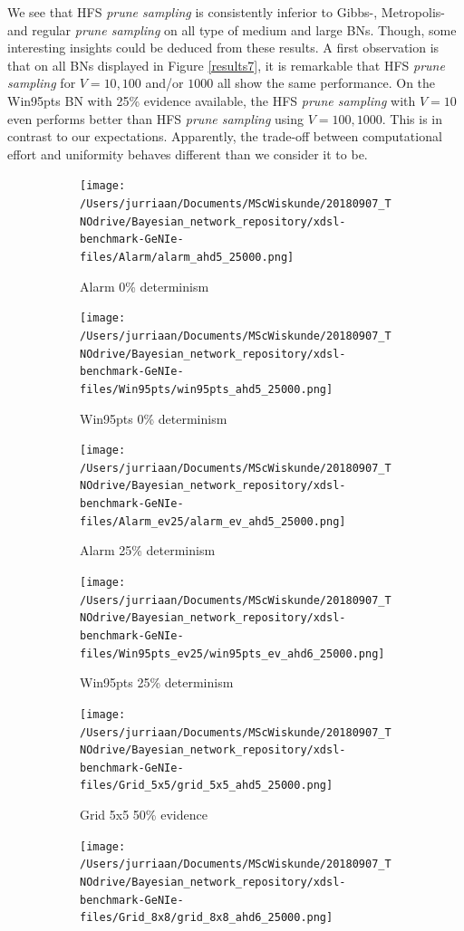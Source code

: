 \documentclass[a4paper, twoside, 11pt]{report}
\theoremstyle{plain}
\theoremstyle{definition}
\theoremstyle{remark}
\newcommand{\ps}{\textit{prune sampling }}
\begin{document}
We see that HFS \ps is consistently inferior to Gibbs-, Metropolis- and regular \ps on all type of medium and large BNs. Though, some interesting insights could be deduced from these results. A first observation is that on all BNs displayed in Figure \ref{results7}, it is remarkable that HFS \ps for $V = 10, 100$ and/or $1000$ all show the same performance. On the Win95pts BN with 25\% evidence available, the HFS \ps with $V = 10$ even performs better than HFS \ps using $V = 100, 1000$. This is in contrast to our expectations. Apparently, the trade-off between computational effort and uniformity behaves different than we consider it to be.
\begin{figure}[h!]
\centering
\begin{subfigure}{.5\linewidth}
\texttt{[image: /Users/jurriaan/Documents/MScWiskunde/20180907\_TNOdrive/Bayesian\_network\_repository/xdsl-benchmark-GeNIe-files/Alarm/alarm\_ahd5\_25000.png]}
\caption{Alarm 0\% determinism}%
\label{alarm_ev}%
\end{subfigure}\hfill%
\begin{subfigure}{.5\linewidth}
\texttt{[image: /Users/jurriaan/Documents/MScWiskunde/20180907\_TNOdrive/Bayesian\_network\_repository/xdsl-benchmark-GeNIe-files/Win95pts/win95pts\_ahd5\_25000.png]}
\caption{Win95pts 0\% determinism}%
\label{win95pts_ev}%
\end{subfigure}
\begin{subfigure}{.5\linewidth}
\texttt{[image: /Users/jurriaan/Documents/MScWiskunde/20180907\_TNOdrive/Bayesian\_network\_repository/xdsl-benchmark-GeNIe-files/Alarm\_ev25/alarm\_ev\_ahd5\_25000.png]}
\caption{Alarm 25\% determinism}%
\label{grid_3x3}%
\end{subfigure}\hfill%
\begin{subfigure}{.5\linewidth}
\texttt{[image: /Users/jurriaan/Documents/MScWiskunde/20180907\_TNOdrive/Bayesian\_network\_repository/xdsl-benchmark-GeNIe-files/Win95pts\_ev25/win95pts\_ev\_ahd6\_25000.png]}
\caption{Win95pts 25\% determinism}%
\label{grid_5x5}%
\end{subfigure}
\begin{subfigure}{.5\linewidth}
\texttt{[image: /Users/jurriaan/Documents/MScWiskunde/20180907\_TNOdrive/Bayesian\_network\_repository/xdsl-benchmark-GeNIe-files/Grid\_5x5/grid\_5x5\_ahd5\_25000.png]}
\caption{Grid 5x5 50\% evidence}%
\label{grid_3x3}%
\end{subfigure}\hfill%
\begin{subfigure}{.5\linewidth}
\texttt{[image: /Users/jurriaan/Documents/MScWiskunde/20180907\_TNOdrive/Bayesian\_network\_repository/xdsl-benchmark-GeNIe-files/Grid\_8x8/grid\_8x8\_ahd6\_25000.png]}

\end{subfigure}
\end{figure}
\end{document}
